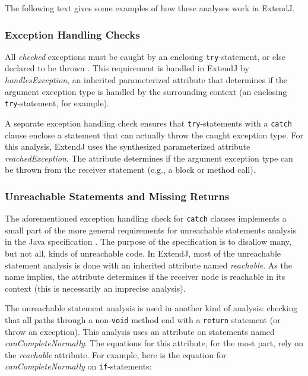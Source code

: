 \documentclass[10pt, twoside, openright]{book}
\begin{document}
\noindent
The following text gives some examples of how these analyses work in ExtendJ.

\subsubsection{Exception Handling Checks}

All \emph{checked} exceptions must be caught by an enclosing \verb'try'-statement, or else declared
to be thrown \cite[\S 11.2]{jls7}.
This requirement is handled in ExtendJ by \emph{handlesException},
an inherited parameterized attribute that determines if the argument exception type
is handled by the surrounding context (an enclosing \verb'try'-statement, for example).

A separate exception handling check ensures that \verb'try'-statements with a \verb'catch' clause
enclose a statement that can actually throw the caught exception type.
For this analysis, ExtendJ uses the synthesized parameterized attribute \emph{reachedException}.
The attribute determines if the argument exception type can be
thrown from the receiver statement (e.g., a block or method call).

\subsubsection{Unreachable Statements and Missing Returns}

The aforementioned exception handling check for \verb'catch' clauses implements
a small part of the more general requirements for unreachable statements
analysis in the Java specification \cite[\S 14.21]{jls7}.
The purpose of the specification is to disallow many, but not all, kinds of unreachable code.
In ExtendJ, most of the unreachable statement analysis is done with an inherited attribute
named \emph{reachable}. As the name implies, the attribute determines if the receiver node
is reachable in its context (this is necessarily an imprecise analysis).

The unreachable statement analysis is used in another kind of analysis: checking that
all paths through a non-\verb'void' method end with a \verb'return' statement (or
throw an exception). This analysis uses an attribute on statements named
\emph{canCompleteNormally}. The equations for this attribute, for the most part, rely on the
\emph{reachable} attribute. For example, here is the equation for \emph{canCompleteNormally}
on \verb'if'-statements:

\end{document}
